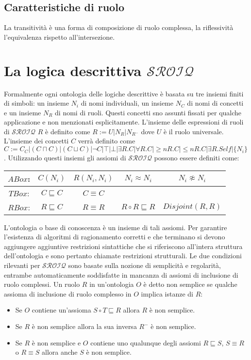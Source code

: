 \subsection{Caratteristiche di ruolo}
La transitivit\`a \`e una forma di composizione di ruolo complessa, la riflessivit\`a l'equivalenza rispetto all'intersezione.
\section{La logica descrittiva $\mathbf{\mathcal{SROIQ}}$}
Formalmente ogni ontologia delle logiche descrittive \`e basata su tre insiemi finiti di simboli: un insieme $N_i$ di nomi individuali, un insieme $N_C$ di nomi di concetti e un insieme $N_R$ di nomi di ruoli.
Questi concetti sno assunti fissati per qualche applicazione e non menzionati esplicitamente. L'insieme delle espressioni di ruoli di $\mathcal{SROIQ}$ $R$ \`e definito come $R:=U|N_R|N_{R^-}$ dove
$U$ \`e il ruolo universale.  L'insieme dei concetti $C$ verr\`a definito come $C:=C_C|(C\sqcap C)|(C\sqcup C)|\neg C|\top|\bot|\exists R.C|\forall R.C|\ge n R.C|\le n R.C| \exists R.Self|\{N_i\}$. Utilizzando 
questi insiemi gli assiomi di $\mathcal{SROIQ}$ possono essere definiti come:
\begin{center}
\begin{tabular}{|c c c c c|}
\hline
$ABox$: & $C(N_i)$ & $R(N_i, N_i)$ & $N_i\approx N_i$ & $N_i\not\approx N_i$\\
\hline
$TBox$: & $C\sqsubseteq C$ & $C\equiv C$ &  & \\
\hline
$RBox$: & $R\sqsubseteq C$ & $R\equiv R$ & $R\circ R\sqsubseteq R$ & $Disjoint(R,R)$\\
\hline
\end{tabular}
\end{center}
L'ontologia o base di conoscenza \`e un insieme di tali assiomi. Per garantire l'esistenza di algoritmi di ragionamento corretti e che terminano si devono aggiungere aggiuntive restrizioni sintattiche che si 
riferiscono all'intera struttura dell'ontologia e sono pertanto chiamate restrizioni strutturali. Le due condizioni rilevanti per $\mathcal{SROIQ}$ sono basate sulla nozione di semplicit\`a e regolarit\`a, entrambe
automaticamente soddisfatte in mancanza di assiomi di inclusione di ruolo complessi. Un ruolo $R$ in un'ontologia $O$ \`e detto non semplice se qualche assioma di inclusione di ruolo complesso in $O$ 
implica istanze di $R$:
\begin{itemize}
\item Se $O$ contiene un'assioma $S\circ T\sqsubseteq R$ allora $R$ \`e non semplice.
\item Se $R$ \`e non semplice allora la sua inversa $R^-$ \`e non semplice.
\item Se $R$  \`e non semplice e $O$ contiene uno qualunque degli assiomi $R\sqsubseteq S$, $S\equiv R$ o $R\equiv S$ allora anche $S$ \`e non semplice.
\end{itemize}
